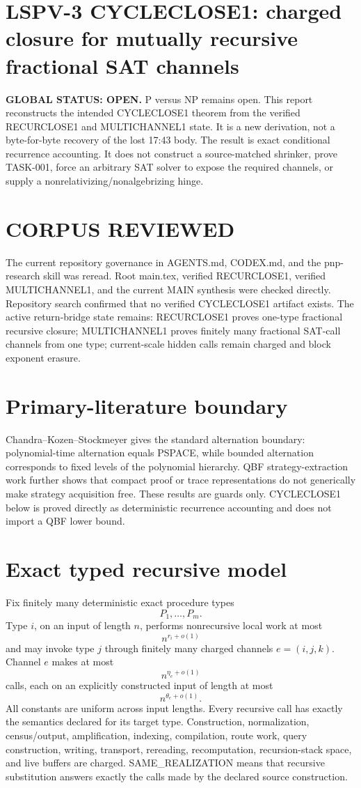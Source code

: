 \documentclass[11pt]{article}
\begin{document}
\section*{LSPV-3 CYCLECLOSE1: charged closure for mutually recursive fractional SAT channels}

\textbf{GLOBAL STATUS: OPEN.} P versus NP remains open. This report reconstructs the intended CYCLECLOSE1 theorem from the verified RECURCLOSE1 and MULTICHANNEL1 state. It is a new derivation, not a byte-for-byte recovery of the lost 17:43 body. The result is exact conditional recurrence accounting. It does not construct a source-matched shrinker, prove TASK-001, force an arbitrary SAT solver to expose the required channels, or supply a nonrelativizing/nonalgebrizing hinge.

\section*{CORPUS REVIEWED}
The current repository governance in AGENTS.md, CODEX.md, and the pnp-research skill was reread. Root main.tex, verified RECURCLOSE1, verified MULTICHANNEL1, and the current MAIN synthesis were checked directly. Repository search confirmed that no verified CYCLECLOSE1 artifact exists. The active return-bridge state remains: RECURCLOSE1 proves one-type fractional recursive closure; MULTICHANNEL1 proves finitely many fractional SAT-call channels from one type; current-scale hidden calls remain charged and block exponent erasure.

\section*{Primary-literature boundary}
Chandra--Kozen--Stockmeyer gives the standard alternation boundary: polynomial-time alternation equals PSPACE, while bounded alternation corresponds to fixed levels of the polynomial hierarchy. QBF strategy-extraction work further shows that compact proof or trace representations do not generically make strategy acquisition free. These results are guards only. CYCLECLOSE1 below is proved directly as deterministic recurrence accounting and does not import a QBF lower bound.

\section*{Exact typed recursive model}
Fix finitely many deterministic exact procedure types
\[
P_1,\ldots,P_m.
\]
Type \(i\), on an input of length \(n\), performs nonrecursive local work at most
\[
n^{r_i+o(1)}
\]
and may invoke type \(j\) through finitely many charged channels \(e=(i,j,k)\). Channel \(e\) makes at most
\[
n^{\eta_e+o(1)}
\]
calls, each on an explicitly constructed input of length at most
\[
n^{\theta_e+o(1)}.
\]
All constants are uniform across input lengths. Every recursive call has exactly the semantics declared for its target type. Construction, normalization, census/output, amplification, indexing, compilation, route work, query construction, writing, transport, rereading, recomputation, recursion-stack space, and live buffers are charged. SAME\_REALIZATION means that recursive substitution answers exactly the calls made by the declared source construction.
\end{document}
